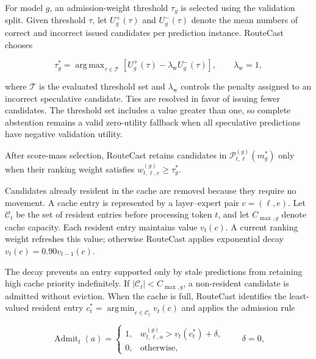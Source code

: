 \documentclass[conference]{IEEEtran}
\DeclareMathOperator*{\argmin}{arg\,min}
\DeclareMathOperator*{\argmax}{arg\,max}
\begin{document}
For model \(g\), an admission-weight threshold \(\tau_g\) is selected using the
validation split. Given threshold \(\tau\), let \(U_g^{+}(\tau)\) and
\(U_g^{-}(\tau)\) denote the mean numbers of correct and incorrect issued
candidates per prediction instance. RouteCast chooses

\begin{equation}
\tau_g^*
=
\argmax_{\tau\in\mathcal{T}}
\left[
U_g^{+}(\tau)
-
\lambda_{\mathrm{w}}U_g^{-}(\tau)
\right],
\qquad
\lambda_{\mathrm{w}}=1,
\label{eq:abstention-threshold}
\end{equation}

where \(\mathcal{T}\) is the evaluated threshold set and
\(\lambda_{\mathrm{w}}\) controls the penalty assigned to an incorrect
speculative candidate. Ties are resolved in favor of issuing fewer
candidates. The threshold set includes a value greater than one, so complete
abstention remains a valid zero-utility fallback when all speculative
predictions have negative validation utility.

After score-mass selection, RouteCast retains candidates in
\(\mathcal{P}_{t,\ell}^{(g)}(m_g^*)\) only when their ranking weight satisfies
\(w_{t,\ell,e}^{(g)}\geq\tau_g^*\).

Candidates already resident in the cache are removed because they require no
movement. A cache entry is represented by a layer--expert pair
\(c=(\ell,e)\). Let \(\mathcal{C}_t\) be the set of resident entries before
processing token \(t\), and let \(C_{\max,g}\) denote cache capacity. Each resident
entry maintains value \(v_t(c)\). A current ranking weight refreshes this
value; otherwise RouteCast applies exponential decay
\(v_t(c)=0.90v_{t-1}(c)\).

The decay prevents an entry supported only by stale predictions from retaining
high cache priority indefinitely. If
\(|\mathcal{C}_t|<C_{\max,g}\), a non-resident candidate is admitted without eviction.
When the cache is full, RouteCast identifies the least-valued resident entry
\(c_t^*=\argmin_{c\in\mathcal{C}_t}v_t(c)\) and applies the admission rule

\begin{equation}
\operatorname{Admit}_t(a)
=
\begin{cases}
1,
&
w_{t,\ell,a}^{(g)}
>
v_t(c_t^*)+\delta, \\[2pt]
0,
&
\text{otherwise},
\end{cases}
\qquad
\delta=0,
\label{eq:cache-admission}
\end{equation}
\end{document}
